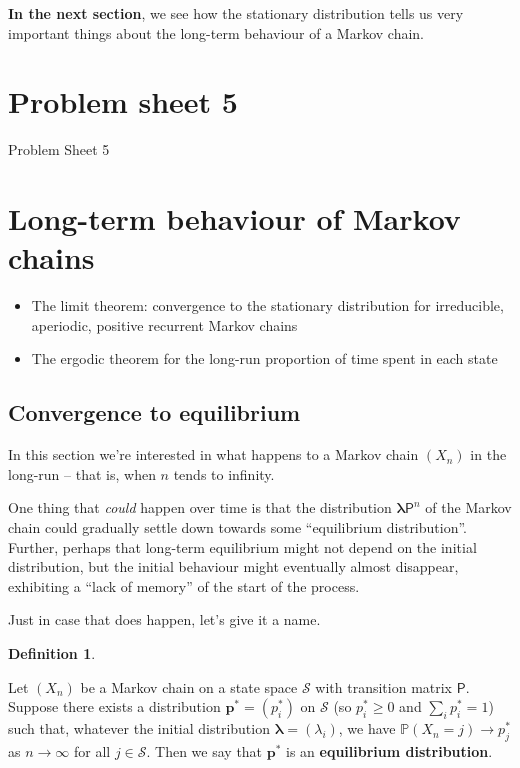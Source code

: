 \documentclass[
  a4paper,
]{article}
\providecommand{\tightlist}{%
  \setlength{\itemsep}{0pt}\setlength{\parskip}{0pt}}
\theoremstyle{definition}
\newtheorem{definition}{Definition}[section]
\theoremstyle{definition}
\theoremstyle{definition}
\theoremstyle{remark}
\begin{document}
\textbf{In the next section}, we see how the stationary distribution tells us very important things about the long-term behaviour of a Markov chain.

\hypertarget{P05}{%
\section*{Problem sheet 5}\label{P05}}

Problem Sheet 5

\hypertarget{S11-long-term-chains}{%
\section{Long-term behaviour of Markov chains}\label{S11-long-term-chains}}

\begin{itemize}
\tightlist
\item
  The limit theorem: convergence to the stationary distribution for irreducible, aperiodic, positive recurrent Markov chains
\item
  The ergodic theorem for the long-run proportion of time spent in each state
\end{itemize}

\hypertarget{equilibrium}{%
\subsection{Convergence to equilibrium}\label{equilibrium}}

In this section we're interested in what happens to a Markov chain \((X_n)\) in the long-run -- that is, when \(n\) tends to infinity.

One thing that \emph{could} happen over time is that the distribution \(\boldsymbol\lambda \mathsf P^n\) of the Markov chain could gradually settle down towards some ``equilibrium distribution''. Further, perhaps that long-term equilibrium might not depend on the initial distribution, but the initial behaviour might eventually almost disappear, exhibiting a ``lack of memory'' of the start of the process.

Just in case that does happen, let's give it a name.

\begin{definition}
\protect\hypertarget{def:eq-dist}{}\label{def:eq-dist}

Let \((X_n)\) be a Markov chain on a state space \(\mathcal S\) with transition matrix \(\mathsf P\). Suppose there exists a distribution \(\mathbf p^* = (p_i^*)\) on \(\mathcal S\) (so \(p_i^* \geq 0\) and \(\sum_i p_i^* = 1\)) such that, whatever the initial distribution \(\boldsymbol\lambda = (\lambda_i)\), we have \(\mathbb P(X_n = j) \to p^*_j\) as \(n \to \infty\) for all \(j \in \mathcal S\). Then we say that \(\mathbf p^*\) is an \textbf{equilibrium distribution}.

\end{definition}
\end{document}
